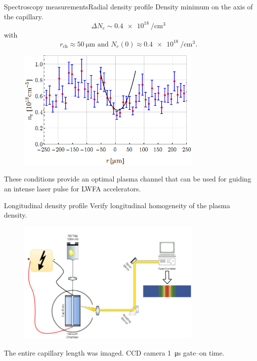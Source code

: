 \documentclass[draft]{beamer}
\begin{document}
  \begin{frame}{Spectroscopy measurements}{Radial density profile}
    Density minimum on the axis of the capillary.
    \begin{equation*}
      \Delta N_e \sim \SI{0.4e18}{\per \cubic \cm}
    \end{equation*}
    with
    \begin{equation*}
      r_\text{ch}\approx \SI{50}{\um} \text{ and } N_e\left(0\right)\approx \SI{0.4e18}{\per\cubic\cm}.
    \end{equation*}
    \begin{figure}
      \includegraphics[width=0.8\textwidth]{figures/results/spectro/parabolic_profile.png}
    \end{figure}
    These conditions provide an optimal plasma channel that can be used for guiding an intense laser pulse for LWFA accelerators.
  \end{frame}
  \begin{frame}{Longitudinal density profile}
    Verify longitudinal homogeneity of the plasma density.
    \begin{figure}
      \includegraphics[width=0.8\textwidth]{figures/results/spectro/longitudinal_system.png}
    \end{figure}
    The entire capillary length was imaged.
    CCD camera \SI{1}{\us} gate--on time.
  \end{frame}
\end{document}
